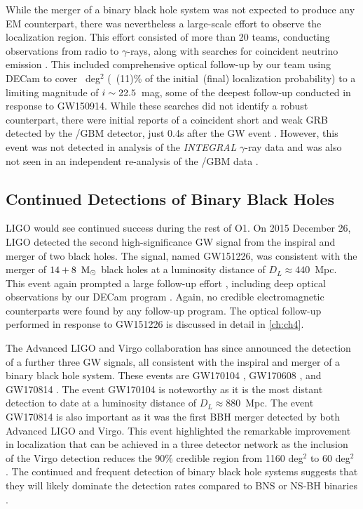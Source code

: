 While the merger of a binary black hole system was not expected to produce any EM counterpart, there was nevertheless a large-scale effort to observe the localization region. This effort consisted of more than 20 teams, conducting observations from radio to $\gamma$-rays, along with searches for coincident neutrino emission \citep{LIGOGW150914FollowUp,LIGOGW150914FollowUpSupp,GW150914IceCube,Annis+16,GW150914Fermi,Evans+16,Kasliwal+16,Savchenko+16,GW150914PS1,GW150914DECam,Tavani+16}. This included comprehensive optical follow-up by our team using DECam to cover ~deg$^2$ (~(11)\% of the initial~(final) localization probability) to a limiting magnitude of $i \sim 22.5$~mag, some of the deepest follow-up conducted in response to GW150914. While these searches did not identify a robust counterpart, there were initial reports of a coincident short and weak GRB detected by the \fermi/GBM detector, just 0.4s after the GW event \citep{GW150914Fermi}. However, this event was not detected in analysis of the {\it INTEGRAL} $\gamma$-ray data \citep{Savchenko+16} and was also not seen in an independent re-analysis of the \fermi/GBM data \citep{Greiner+16}.

\subsection{Continued Detections of Binary Black Holes}
\label{sec:intro_bbhs}
LIGO would see continued success during the rest of O1. On 2015 December 26, LIGO detected the second high-significance GW signal from the inspiral and merger of two black holes. The signal, named GW151226, was consistent with the merger of $14+8~{\rm\,M_\odot}$ black holes at a luminosity distance of $D_L \approx 440$~Mpc. This event again prompted a large follow-up effort \citep[see e.g.,][]{GW150914PS1,Yoshida+17}, including deep optical observations by our DECam program \citep{Cowp+16}. Again, no credible electromagnetic counterparts were found by any follow-up program. The optical follow-up performed in response to GW151226 is discussed in detail in \cref{ch:ch4}.

The Advanced LIGO and Virgo collaboration has since announced the detection of a further three GW signals, all consistent with the inspiral and merger of a binary black hole system. These events are GW170104 \citep{LIGOGW170104}, GW170608 \citep{LIGOGW170608}, and GW170814 \citep{LIGOGW170814}. The event GW170104 is noteworthy as it is the most distant detection to date at a luminosity distance of $D_L \approx 880$~Mpc. The event GW170814 is also important as it was the first BBH merger detected by both Advanced LIGO and Virgo. This event highlighted the remarkable improvement in localization that can be achieved in a three detector network as the inclusion of the Virgo detection reduces the 90\% credible region from 1160 deg$^2$ to 60 deg$^2$ \citep{LIGOGW170814}. The continued and frequent detection of binary black hole systems suggests that they will likely dominate the detection rates compared to BNS or NS-BH binaries \citep{LIGOBBHRates}.

